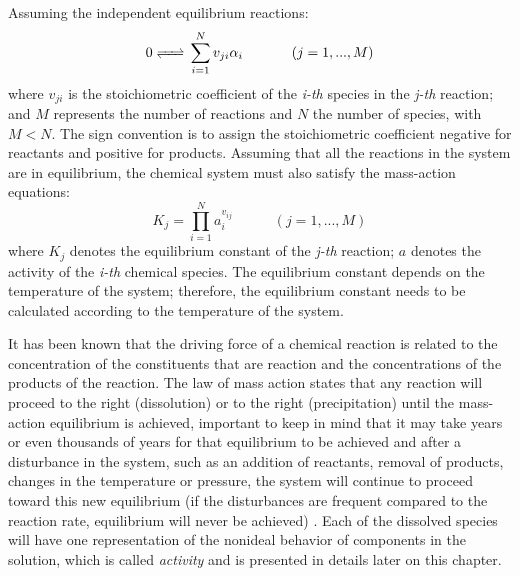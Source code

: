 \documentclass[ppgc,mestrado,english]{iiufrgs}
\begin{document}
Assuming the independent equilibrium reactions:
\begin{equation}\label{reaction}
0 \ce{<=>} \sum\limits_{i=1}^N  v_{ji} \alpha_i \hspace{35pt}    (j = 1, ... , M)
\end{equation}
where $v_{ji}$ is the stoichiometric coefficient of the \emph{i-th} species in the \emph{j-th} reaction; and $M$ represents the number of reactions and $N$ the number of species, with $M < N$. The sign convention is to assign the stoichiometric coefficient negative for reactants and positive for products. Assuming that all the reactions in the system are in equilibrium, the chemical system must also satisfy the mass-action equations:
\begin{equation}\label{equilibrium_reaction}
K_j =  \prod\limits_{i=1}^N  a_i^{v_{ij}} \hspace{35pt}    (j = 1, ... , M)
\end{equation}
where $K_j$ denotes the equilibrium constant of the \emph{j-th} reaction; $a$ denotes the activity of the \emph{i-th} chemical species. The equilibrium constant depends on the temperature of the system; therefore, the equilibrium constant needs to be calculated according to the temperature of the system. 

It has been known that the driving force of a chemical reaction is related to the concentration of the constituents that are reaction and the concentrations of the products of the reaction. The law of mass action states that any reaction will proceed to the right (dissolution) or to the right (precipitation) until the mass-action equilibrium is achieved, important to keep in mind that it may take years or even thousands of years for that equilibrium to be achieved and after a disturbance in the system, such as an addition of reactants, removal of products, changes in the temperature or pressure, the system will continue to proceed toward this new equilibrium (if the disturbances are frequent compared to the reaction rate, equilibrium will never be achieved) \cite{Freeze:79}. Each of the dissolved species will have one representation of the nonideal behavior of components in the solution, which is called \emph{activity} and is presented in details later on this chapter.
\end{document}
